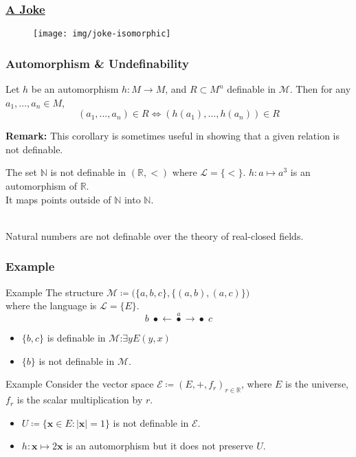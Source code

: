 \documentclass[UTF8,aspectratio=43,11pt,colorlinks,compress,openany]{beamer}%
\begin{document}
\begin{frame}\frametitle{\href{https://mathoverflow.net/questions/53122/mathematical-urban-legends}{A Joke}}
	\begin{figure}
	\texttt{[image: img/joke-isomorphic]}
	\end{figure}
\end{frame}

\begin{frame}\frametitle{Automorphism \& Undefinability}
	\begin{corollary}
		Let $h$ be an automorphism $h: M\to M$, and $R\subset M^n$ definable in $\mathcal{M}$. Then for any $a_1,\dots,a_n\in M$,
		\[(a_1,\dots,a_n)\in R\iff(h(a_1),\dots,h(a_n))\in R\]
	\end{corollary}
	\textbf{Remark:} This corollary is sometimes useful in showing that a given relation is not definable.
	\begin{block}{The set $\mathbb{N}$ is not definable in $(\mathbb{R},<)$ where $\mathscr{L}=\{<\}$.}
		$h: a\mapsto a^3$ is an automorphism of $\mathbb{R}$.\\
		It maps points outside of $\mathbb{N}$ into $\mathbb{N}$.
	\end{block}
	\begin{center}
		\\
		Natural numbers are not definable over the theory of real-closed fields.
	\end{center}
\end{frame}

\begin{frame}\frametitle{Example}
\setlength\belowdisplayskip{0pt}
\begin{block}{Example}
	The structure $\mathcal{M}\coloneqq \big(\{a,b,c\},\{(a,b),(a,c)\}\big)$\\
	where the language is $\mathscr{L}=\{E\}$.
	\[b\;\bullet\mathbf{\leftarrow}\stackrel{a}{\bullet}\mathbf{\to}\bullet\;c\]
	\begin{itemize}
		\item $\{b,c\}$ is definable in $\mathcal{M}$:\quad $\exists y E(y,x)$
		\item $\{b\}$ is not definable in $\mathcal{M}$.
	\end{itemize}
\end{block}
\begin{block}{Example}
Consider the vector space $\mathcal{E}\coloneqq (E,+,f_r)_{r\in\mathbb{R}}$, where $E$ is the universe, $f_r$ is the scalar multiplication by $r$.
\begin{itemize}
	\item $U\coloneqq \{\mathbf{x}\in E: |\mathbf{x}|=1\}$ is not definable in $\mathcal{E}$.
	\item $h:\mathbf{x}\mapsto 2\mathbf{x}$ is an automorphism but it does not preserve $U$.
\end{itemize}
\end{block}
\end{frame}
\end{document}
